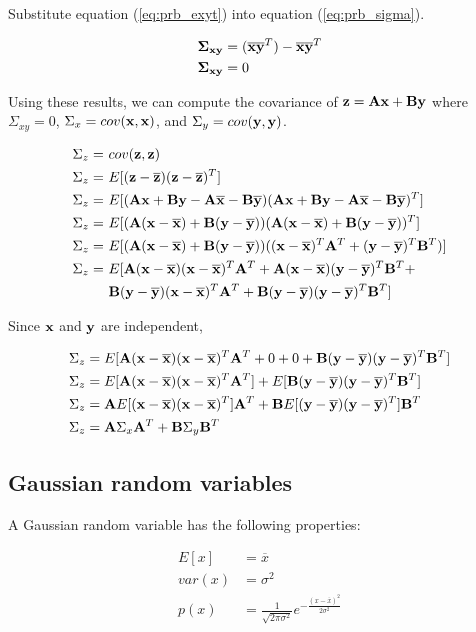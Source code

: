 Substitute equation (\ref{eq:prb_exyt}) into equation (\ref{eq:prb_sigma}).

\begin{align*}
  \mathbf{\Sigma}_{\mathbf{x}\mathbf{y}} &= (\overline{\mathbf{x}}\overline{\mathbf{y}}^T) -
    \overline{\mathbf{x}}\overline{\mathbf{y}}^T \\
  \mathbf{\Sigma}_{\mathbf{x}\mathbf{y}} &= 0
\end{align*}

Using these results, we can compute the covariance of
$\mathbf{z} = \mathbf{A}\mathbf{x} + \mathbf{B}\mathbf{y}$ where $\Sigma_{xy} = 0$,
$\Sigma_x = cov(\mathbf{x}, \mathbf{x})$, and $\Sigma_y = cov(\mathbf{y}, \mathbf{y})$.

\begin{align*}
  \Sigma_z =~& cov(\mathbf{z}, \mathbf{z}) \\
  \Sigma_z =~& E[(\mathbf{z} - \overline{\mathbf{z}})(\mathbf{z} - \overline{\mathbf{z}})^T] \\
  \Sigma_z =~& E[(\mathbf{A}\mathbf{x} + \mathbf{B}\mathbf{y} - \mathbf{A}\overline{\mathbf{x}} -
    \mathbf{B}\overline{\mathbf{y}})(\mathbf{A}\mathbf{x} + \mathbf{B}\mathbf{y} -
    \mathbf{A}\overline{\mathbf{x}} - \mathbf{B}\overline{\mathbf{y}})^T] \\
  \Sigma_z =~& E[(\mathbf{A}(\mathbf{x} - \overline{\mathbf{x}}) +
    \mathbf{B}(\mathbf{y} - \overline{\mathbf{y}}))
    (\mathbf{A}(\mathbf{x} - \overline{\mathbf{x}}) +
     \mathbf{B}(\mathbf{y} - \overline{\mathbf{y}}))^T] \\
  \Sigma_z =~& E[(\mathbf{A}(\mathbf{x} - \overline{\mathbf{x}}) +
    \mathbf{B}(\mathbf{y} - \overline{\mathbf{y}}))
    ((\mathbf{x} - \overline{\mathbf{x}})^T\mathbf{A}^T +
     (\mathbf{y} - \overline{\mathbf{y}})^T\mathbf{B}^T)] \\
  \Sigma_z =~& E[
    \mathbf{A}(\mathbf{x} - \overline{\mathbf{x}})(\mathbf{x} - \overline{\mathbf{x}})^T\mathbf{A}^T +
    \mathbf{A}(\mathbf{x} - \overline{\mathbf{x}})(\mathbf{y} - \overline{\mathbf{y}})^T\mathbf{B}^T + \\
    &\mathbf{B}(\mathbf{y} - \overline{\mathbf{y}})(\mathbf{x} - \overline{\mathbf{x}})^T\mathbf{A}^T +
    \mathbf{B}(\mathbf{y} - \overline{\mathbf{y}})(\mathbf{y} - \overline{\mathbf{y}})^T\mathbf{B}^T]
\end{align*}

Since $\mathbf{x}$ and $\mathbf{y}$ are independent,

\begin{align*}
  \Sigma_z &= E[
    \mathbf{A}(\mathbf{x} - \overline{\mathbf{x}})(\mathbf{x} - \overline{\mathbf{x}})^T\mathbf{A}^T + 0 + 0 +
    \mathbf{B}(\mathbf{y} - \overline{\mathbf{y}})(\mathbf{y} - \overline{\mathbf{y}})^T\mathbf{B}^T] \\
  \Sigma_z &=
    E[\mathbf{A}(\mathbf{x} - \overline{\mathbf{x}})(\mathbf{x} - \overline{\mathbf{x}})^T\mathbf{A}^T] +
    E[\mathbf{B}(\mathbf{y} - \overline{\mathbf{y}})(\mathbf{y} - \overline{\mathbf{y}})^T\mathbf{B}^T] \\
  \Sigma_z &=
    \mathbf{A}E[(\mathbf{x} - \overline{\mathbf{x}})(\mathbf{x} - \overline{\mathbf{x}})^T]\mathbf{A}^T +
    \mathbf{B}E[(\mathbf{y} - \overline{\mathbf{y}})(\mathbf{y} - \overline{\mathbf{y}})^T]\mathbf{B}^T \\
  \Sigma_z &=\mathbf{A}\Sigma_x\mathbf{A}^T + \mathbf{B}\Sigma_y\mathbf{B}^T
\end{align*}

\subsection{Gaussian random variables}

A Gaussian random variable has the following properties:

\begin{align*}
  E[x] &= \overline{x} \\
  var(x) &= \sigma^2 \\
  p(x) &= \frac{1}{\sqrt{2\pi\sigma^2}}
    e^{-\frac{(x - \overline{x})^2}{2\sigma^2}}
\end{align*}
